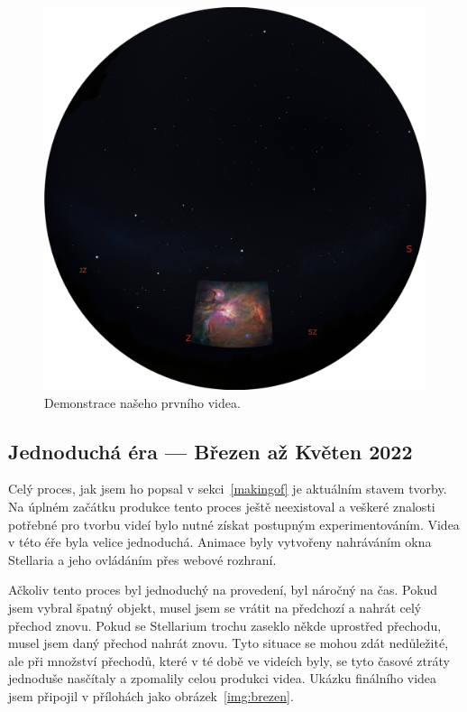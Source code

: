 \documentclass[12pt,a4paper,titlepage]{article}
\begin{document}
\begin{figure}[ht]
	\centering
	\includegraphics[width=.7\textwidth]{prosinec.eps}
	\caption{Demonstrace našeho prvního videa.}\label{img:prosinec}
\end{figure}
\subsection{Jednoduchá éra --- Březen až Květen 2022}
Celý proces, jak jsem ho popsal v sekci~\ref{makingof} je aktuálním stavem tvorby. Na úplném začátku produkce tento proces ještě neexistoval a veškeré znalosti potřebné pro tvorbu  videí bylo nutné získat postupným experimentováním. Videa v této éře byla velice jednoduchá. Animace byly vytvořeny nahráváním okna Stellaria a jeho ovládáním přes webové rozhraní. 

Ačkoliv tento proces byl jednoduchý na provedení, byl náročný na čas. Pokud jsem vybral špatný objekt, musel jsem se vrátit na předchozí a nahrát celý přechod znovu. Pokud se Stellarium trochu zaseklo někde uprostřed přechodu, musel jsem daný přechod nahrát znovu. Tyto situace se mohou zdát nedůležité, ale při množství přechodů, které v té době ve videích byly, se tyto časové ztráty jednoduše nasčítaly a zpomalily celou produkci videa. Ukázku finálního videa jsem připojil v přílohách jako obrázek~\ref{img:brezen}.
\end{document}

